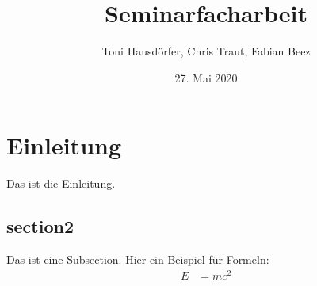 \documentclass[a4paper, 10pt]{scrartcl}
\title{Seminarfacharbeit}
\author{Toni Hausdörfer, Chris Traut, Fabian Beez}
\date{27. Mai 2020}
\begin{document}
 
\maketitle
\tableofcontents

\section{Einleitung}
Das ist die Einleitung. 


\subsection{section2}
Das ist eine Subsection. Hier ein Beispiel für Formeln:
\begin{align}
 E &= mc^2
\end{align}
\end{document}
